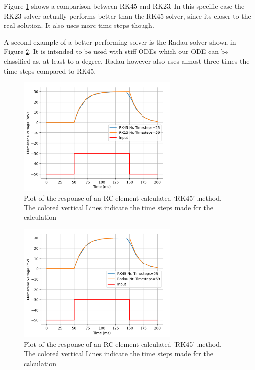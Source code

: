 \documentclass{article}
\begin{document}
    \vspace{10pt}
    Figure \ref{fig:RK45_vs_RK23} shows a comparison between RK45 and RK23. In this specific case the RK23 solver actually performs better than the RK45 solver, since its closer to the real solution. It also uses more time steps though.

    \vspace{10pt}
    A second example of a better-performing solver is the Radau solver shown in Figure \ref{fig:RK45_vs_Radau}. It is intended to be used with stiff ODEs which our ODE can be classified as, at least to a degree. Radau however also uses almost three times the time steps compared to RK45.
    \begin{figure}[h!]
        \centering
        \includegraphics[width=0.7\textwidth]{RK45_vs_RK23.png}
        \caption{Plot of the response of an RC element calculated ‘RK45’ method. The colored vertical Lines indicate the time steps made for the calculation.}
        \label{fig:RK45_vs_RK23}
    \end{figure}
    \begin{figure}[h!]
        \centering
        \includegraphics[width=0.7\textwidth]{RK45_vs_Radau.png}
        \caption{Plot of the response of an RC element calculated ‘RK45’ method. The colored vertical Lines indicate the time steps made for the calculation.}
        \label{fig:RK45_vs_Radau}
    \end{figure}
\end{document}
